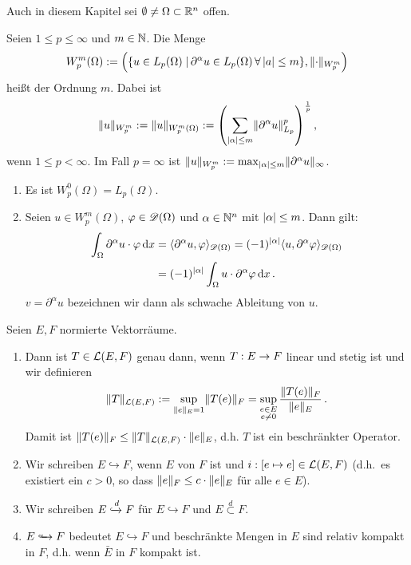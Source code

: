 
Auch in diesem Kapitel sei $\emptyset\neq\Omega\subset\mathbb{R}^n$ offen.

\begin{defi}
  Seien $1\leq p\leq\infty$ und $m\in\mathbb{N}$. Die Menge
  \[
  W_p^m(\Omega):=\left(
    \{u\in L_p(\Omega)\;\vert\,\partial^\alpha u\in L_p(\Omega)\,\forall\,\lvert a\rvert\leq m\}
    , \lVert \cdot\rVert_{W_p^m}
  \right)
  \]
  heißt  der Ordnung $m$. Dabei ist 
  \[
  \lVert u\rVert_{W_p^m}:=\lVert u\rVert_{W_p^m(\Omega)}:=
  \left(
    \sum_{\lvert \alpha\rvert\leq m}\lVert \partial^\alpha u\rVert_{L_p}^p
  \right)^{\frac 1p},
  \]
  wenn $1\leq p<\infty$. Im Fall $p=\infty$ ist $\lVert u\rVert_{W_p^m}:=\max_{\lvert \alpha\rvert\leq m}\lVert \partial^\alpha u\rVert_\infty$.
\end{defi}

\begin{bem}
  \label{bem:6.1}
  \begin{enumerate}[\rm(a)]
  \item Es ist $W_p^0(\Omega)=L_p(\Omega)$.
  \item Seien $u\in W_p^m(\Omega)$, $\varphi\in\mathscr{D}(\Omega)$ und $\alpha\in\mathbb{N}^n$ mit $\lvert \alpha\rvert\leq m$. Dann gilt:
    \[
    \begin{split}
      \int_\Omega\partial^\alpha u\cdot\varphi\,\mathrm{d} x
      &=\langle\partial^\alpha u,\varphi\rangle_{\mathscr{D}(\Omega)}
      =(-1)^{\lvert \alpha\rvert}\langle u,\partial^\alpha\varphi\rangle_{\mathscr{D}(\Omega)} \\
      &=(-1)^{\lvert \alpha\rvert}\int_\Omega u\cdot\partial^\alpha\varphi\,\mathrm{d} x\, .
    \end{split}
    \]
    $v = \partial^\alpha u$ bezeichnen wir dann als schwache Ableitung von $u$.
  \end{enumerate}
\end{bem}

\begin{defi}
  Seien $E,F$ normierte Vektorräume.
  \begin{enumerate}[\rm(a)]
  \item Dann ist $T\in\mathcal{L}(E,F)$ genau dann, wenn $T:E\rightarrow F$
    linear und stetig ist und wir definieren
    \[
    \lVert T\rVert_{\mathcal{L}(E,F)}:=\sup_{\lVert e\rVert_E=1}\lVert T(e)\rVert_F=\sup_{
      \begin{subarray}{c}
        e\in E \\
        e\neq 0
      \end{subarray}}\frac{\lVert T(e)\rVert_F}{\lVert e\rVert_E}\, .
    \]
    Damit ist $\lVert T(e)\rVert_F\leq\lVert T\rVert_{\mathcal{L}(E,F)}\cdot\lVert e\rVert_E$, d.h. $T$ ist  ein beschränkter Operator.
  \item Wir schreiben $E\hookrightarrow F$, wenn $E$  von $F$ ist und $i:[e\mapsto e]\in\mathcal{L}(E,F)$ (d.h.\ es existiert ein $c>0$, so dass $\lVert e\rVert_F\leq c\cdot\lVert e\rVert_E$ für alle $e\in E$).
  \item Wir schreiben $E\xhookrightarrow{d}F$ für $E\hookrightarrow F$ und $E \overset d\subset F$.
  \item $E\hhookrightarrow F$ bedeutet $E\hookrightarrow F$ und beschränkte Mengen in $E$ sind relativ kompakt in $F$, d.h. wenn $\bar E$ in $F$ kompakt ist.
  \end{enumerate}
\end{defi}

